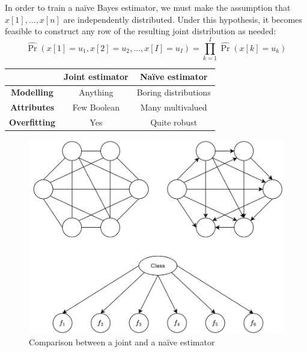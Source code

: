 In order to train a naïve Bayes estimator, we must make the assumption that $x[1],\dots,x[n]$ are independently distributed. 
Under this hypothesis, it becomes feasible to construct any row of the resulting joint distribution as needed:
\[\widehat{\Pr}(x[1]=u_1,x[2]=u_2,\dots,x[I]=u_I) = \prod_{k=1}^{I} \widehat{\Pr}(x[k]=u_k)\]
\begin{table}[H]
    \centering
    \begin{tabular}{c|c|c|}
    \cline{2-3}
                                                & \textbf{Joint estimator} & \textbf{Naïve estimator} \\ \hline
    \multicolumn{1}{|c|}{\textbf{Modelling}}   & Anything                 & Boring distributions     \\ 
    \multicolumn{1}{|c|}{\textbf{Attributes}}  & Few Boolean              & Many multivalued         \\ 
    \multicolumn{1}{|c|}{\textbf{Overfitting}} & Yes                      & Quite robust             \\ \hline
    \end{tabular}
\end{table}
\begin{figure}[H]
    \centering
    \includegraphics[width=0.5\linewidth]{images/naive-joint.png}
    \caption{Comparison between a joint and a naïve estimator}
\end{figure}